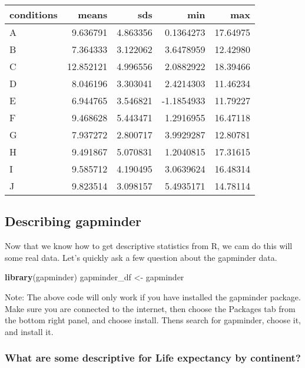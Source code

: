 \documentclass[
]{book}
\newenvironment{Shaded}{\begin{snugshade}}{\end{snugshade}}
\newcommand{\FunctionTok}[1]{\textcolor[rgb]{0.13,0.29,0.53}{\textbf{#1}}}
\newcommand{\NormalTok}[1]{#1}
\newcommand{\OtherTok}[1]{\textcolor[rgb]{0.56,0.35,0.01}{#1}}
\begin{document}
\begin{tabular}{l|r|r|r|r}
\hline
conditions & means & sds & min & max\\
\hline
A & 9.636791 & 4.863356 & 0.1364273 & 17.64975\\
\hline
B & 7.364333 & 3.122062 & 3.6478959 & 12.42980\\
\hline
C & 12.852121 & 4.996556 & 2.0882922 & 18.39466\\
\hline
D & 8.046196 & 3.303041 & 2.4214303 & 11.46234\\
\hline
E & 6.944765 & 3.546821 & -1.1854933 & 11.79227\\
\hline
F & 9.468628 & 5.443471 & 1.2916955 & 16.47118\\
\hline
G & 7.937272 & 2.800717 & 3.9929287 & 12.80781\\
\hline
H & 9.491867 & 5.070831 & 1.2040815 & 17.31615\\
\hline
I & 9.585712 & 4.190495 & 3.0639624 & 16.48314\\
\hline
J & 9.823514 & 3.098157 & 5.4935171 & 14.78114\\
\hline
\end{tabular}

\hypertarget{describing-gapminder}{%
\subsection{Describing gapminder}\label{describing-gapminder}}

Now that we know how to get descriptive statistics from R, we cam do this will some real data. Let's quickly ask a few question about the gapminder data.

\begin{Shaded}
\begin{Highlighting}[]
\FunctionTok{library}\NormalTok{(gapminder)}
\NormalTok{gapminder\_df }\OtherTok{\textless{}{-}}\NormalTok{ gapminder}
\end{Highlighting}
\end{Shaded}

Note: The above code will only work if you have installed the gapminder package. Make sure you are connected to the internet, then choose the Packages tab from the bottom right panel, and choose install. Thens search for gapminder, choose it, and install it.

\hypertarget{what-are-some-descriptive-for-life-expectancy-by-continent}{%
\subsubsection{What are some descriptive for Life expectancy by continent?}\label{what-are-some-descriptive-for-life-expectancy-by-continent}}
\end{document}
